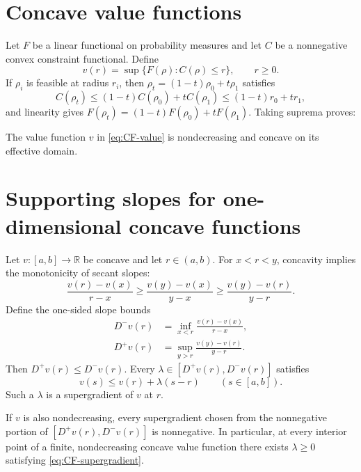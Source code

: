 \section{Concave value functions}
Let $F$ be a linear functional on probability measures and let $C$ be a nonnegative
convex constraint functional.  Define
\begin{equation}\label{eq:CF-value}
 v(r)=\sup\{F(\rho):C(\rho)\le r\},
 \qquad r\ge0.
\end{equation}
If $\rho_i$ is feasible at radius $r_i$, then
$\rho_t=(1-t)\rho_0+t\rho_1$ satisfies
\[
 C(\rho_t)\le(1-t)C(\rho_0)+tC(\rho_1)
 \le(1-t)r_0+tr_1,
\]
and linearity gives
$F(\rho_t)=(1-t)F(\rho_0)+tF(\rho_1)$.  Taking suprema proves:

\begin{proposition}
The value function $v$ in \eqref{eq:CF-value} is nondecreasing and concave on its
effective domain.
\end{proposition}

\section{Supporting slopes for one-dimensional concave functions}
Let $v:[a,b]\to\mathbb R$ be concave and let $r\in(a,b)$.  For $x<r<y$, concavity
implies the monotonicity of secant slopes:
\begin{equation}\label{eq:CF-secant-order}
 \frac{v(r)-v(x)}{r-x}
 \ge
 \frac{v(y)-v(x)}{y-x}
 \ge
 \frac{v(y)-v(r)}{y-r}.
\end{equation}
Define the one-sided slope bounds
\begin{align}
 D^-v(r)&=\inf_{x<r}\frac{v(r)-v(x)}{r-x},\\
 D^+v(r)&=\sup_{y>r}\frac{v(y)-v(r)}{y-r}.
\end{align}
Then $D^+v(r)\le D^-v(r)$.  Every
$\lambda\in[D^+v(r),D^-v(r)]$ satisfies
\begin{equation}\label{eq:CF-supergradient}
 v(s)\le v(r)+\lambda(s-r)
 \qquad(s\in[a,b]).
\end{equation}
Such a $\lambda$ is a supergradient of $v$ at $r$.

\begin{proposition}
If $v$ is also nondecreasing, every supergradient chosen from the nonnegative portion of
$[D^+v(r),D^-v(r)]$ is nonnegative.  In particular, at every interior point of a finite,
nondecreasing concave value function there exists $\lambda\ge0$ satisfying
\eqref{eq:CF-supergradient}.
\end{proposition}

